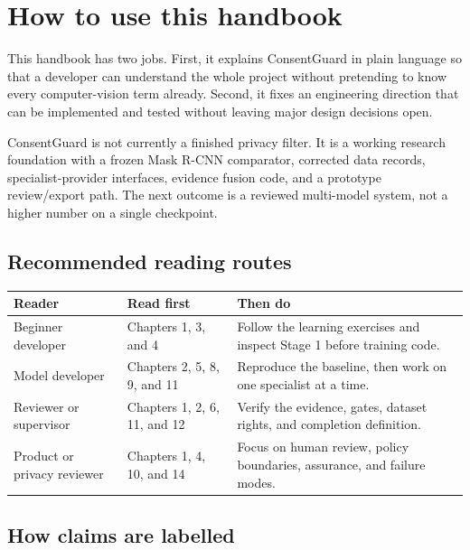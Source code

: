\chapter*{How to use this handbook}

This handbook has two jobs. First, it explains ConsentGuard in plain language so that a developer can understand the whole project without pretending to know every computer-vision term already. Second, it fixes an engineering direction that can be implemented and tested without leaving major design decisions open.

\begin{truthbox}
ConsentGuard is not currently a finished privacy filter. It is a working research foundation with a frozen Mask R-CNN comparator, corrected data records, specialist-provider interfaces, evidence fusion code, and a prototype review/export path. The next outcome is a reviewed multi-model system, not a higher number on a single checkpoint.
\end{truthbox}

\section*{Recommended reading routes}

\begin{tabularx}{\textwidth}{@{}L{32mm}YY@{}}
\toprule
\textbf{Reader} & \textbf{Read first} & \textbf{Then do} \\
\midrule
Beginner developer & Chapters 1, 3, and 4 & Follow the learning exercises and inspect Stage 1 before training code. \\
Model developer & Chapters 2, 5, 8, 9, and 11 & Reproduce the baseline, then work on one specialist at a time. \\
Reviewer or supervisor & Chapters 1, 2, 6, 11, and 12 & Verify the evidence, gates, dataset rights, and completion definition. \\
Product or privacy reviewer & Chapters 1, 4, 10, and 14 & Focus on human review, policy boundaries, assurance, and failure modes. \\
\bottomrule
\end{tabularx}

\section*{How claims are labelled}

